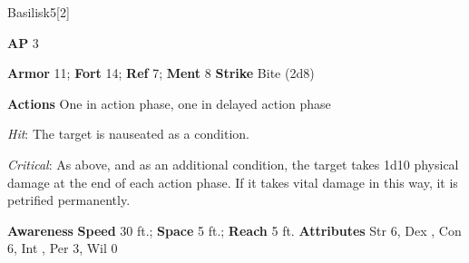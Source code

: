 \begin{monsection}{Basilisk}{5}[2]
\vspace{-1em}\vspace{-1em}
\begin{spellcontent}
\begin{spelltargetinginfo}
{\textbf{AP} 3}

\pari \textbf{Armor} 11;
\textbf{Fort} 14;
\textbf{Ref} 7;
\textbf{Ment} 8
\pari \textbf{Strike} Bite  (2d8)


\pari \textbf{Actions} One in action phase, one in delayed action phase
\end{spelltargetinginfo}


\begin{spelleffects}

\pari

\par


\par \textit{Hit}: The target is nauseated as a condition.
\par \textit{Critical}:
As above, and as an additional condition, the target takes 1d10 physical damage at the end of each action phase.
If it takes vital damage in this way, it is petrified permanently.


\end{spelleffects}

\end{spellcontent}

\begin{monsterfooter}
\pari \textbf{Awareness} 
\pari \textbf{Speed} 30 ft.;
\textbf{Space} 5 ft.;
\textbf{Reach} 5 ft.
\pari \textbf{Attributes}
Str 6,
Dex ,
Con 6,
Int ,
Per 3,
Wil 0
\end{monsterfooter}
\end{monsection}



